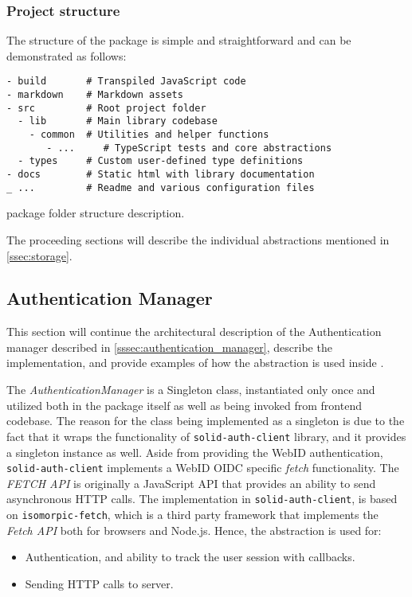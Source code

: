 \subsubsection{Project structure}

The structure of the \lpas{} package is simple and straightforward and can be demonstrated as follows:

\begin{listing}[H]    
\begin{verbatim}
- build       # Transpiled JavaScript code    
- markdown    # Markdown assets
- src         # Root project folder
  - lib       # Main library codebase
    - common  # Utilities and helper functions
       - ...     # TypeScript tests and core abstractions
  - types     # Custom user-defined type definitions
- docs        # Static html with library documentation
_ ...         # Readme and various configuration files
\end{verbatim}
\caption{\lpas{} package folder structure description.} 
\label{lst:lpas_folder_structure}
\end{listing}

The proceeding sections will describe the individual abstractions mentioned in \autoref{ssec:storage}.

\subsection{Authentication Manager}
\label{sssec:authentication_manager_implementation}

This section will continue the architectural description of the Authentication manager described in \autoref{sssec:authentication_manager}, describe the implementation, and provide examples of how the abstraction is used inside \lpa{}.

The \textit{AuthenticationManager} is a Singleton class, instantiated only once and utilized both in the package itself as well as being invoked from \lpa{} frontend codebase. The reason for the class being implemented as a singleton is due to the fact that it wraps the functionality of \texttt{solid-auth-client} library, and it provides a singleton instance as well. Aside from providing the WebID authentication,  \texttt{solid-auth-client} implements a WebID OIDC specific \textit{fetch} functionality. The \textit{FETCH API} is originally a JavaScript API that provides an ability to send asynchronous HTTP calls. The implementation in \texttt{solid-auth-client}, is based on \texttt{isomorpic-fetch}, which is a third party framework that implements the \textit{Fetch API} both for browsers and Node.js. Hence, the abstraction is used for:
\begin{itemize}
    \item Authentication, and ability to track the user session with callbacks. 
    \item Sending HTTP calls to \solid{} server.
\end{itemize}


